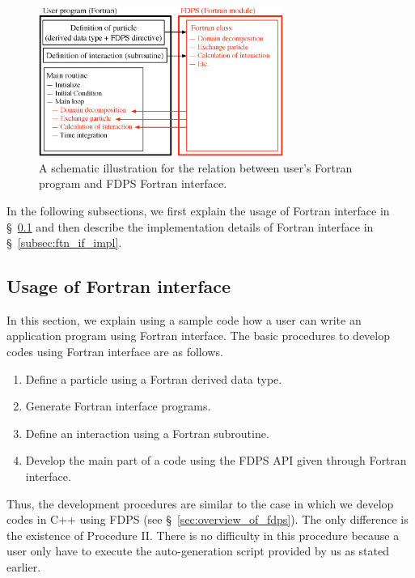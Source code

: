 \documentclass[twocolumn,useamsfonts]{pasj01}
\begin{document}
\begin{figure}[h]
\begin{center}
\includegraphics[width=8cm]{figures/FTN_IF_UI}
\end{center}
\caption{A schematic illustration for the relation between user's Fortran program and FDPS Fortran interface.}
\label{fig:ftn_if_ui}  
\end{figure}

In the following subsections, we first explain the usage of Fortran interface in \S~\ref{subsec:ftn_if_usage} and then describe the implementation details of Fortran interface in \S~\ref{subsec:ftn_if_impl}.

\subsection{Usage of Fortran interface}
\label{subsec:ftn_if_usage}
In this section, we explain using a sample code how a user can write an application program using Fortran interface. The basic procedures to develop codes using Fortran interface are as follows.
\begin{enumerate}[label=\Roman*.]
\item Define a particle using a Fortran derived data type. 
\item Generate Fortran interface programs.
\item Define an interaction using a Fortran subroutine. 
\item Develop the main part of a code using the FDPS API given through Fortran interface. 
\end{enumerate}
Thus, the development procedures are similar to the case in which we develop codes in C++ using FDPS (see \S~\ref{sec:overview_of_fdps}). The only difference is the existence of Procedure II. There is no difficulty in this procedure because a user only have to execute the auto-generation script provided by us as stated earlier.
\end{document}
